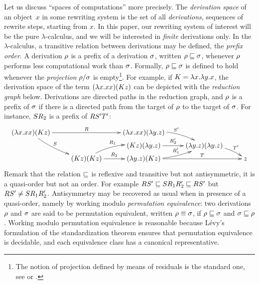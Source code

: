 Let us discuss ``spaces of computations'' more precisely.
The \emph{derivation space} of an object~$x$ in some rewriting system
is the set of all {\em derivations}, \ie sequences of rewrite steps, starting from $x$.
In this paper, our rewriting system of interest will be the pure $\lambda$-calculus,
and we will be interested in \emph{finite} derivations only.
In the $\lambda$-calculus,
a transitive relation between derivations may be defined, the {\em prefix order}.
A derivation $\rho$ is a prefix of a derivation $\sigma$,
written $\rho \sqsubseteq \sigma$,
whenever $\rho$ performs less computational work than $\sigma$.
Formally, $\rho \sqsubseteq \sigma$ is defined to hold whenever the {\em projection} $\rho/\sigma$ 
is empty\footnote{The notion of projection defined by means of residuals
is the standard one, see \eg \cite[Chapter~12]{Barendregt:1984}
or \cite[Section~8.7]{Terese}.}.
For example, if $K = \lambda x. \lambda y. x$,
the derivation space of the term $(\lambda x. xx)(Kz)$
can be depicted with the \emph{reduction graph} below.
Derivations are directed paths in the reduction graph,
and $\rho$ is a prefix of $\sigma$ if there is a directed path from the
target of $\rho$ to the target of $\sigma$.
For instance, $SR_2$ is a prefix of $RS'T'$:
\[
  \xymatrix@R=.1cm{
    (\lam{\var}{\var\var})(K\varthree)
      \ar^-{\redex}[rr]
      \ar@/_.2cm/^-{\redextwo}[rdd]
  &
  &
    (\lam{\var}{\var\var})(\lam{\vartwo}{\varthree})
    \ar@/^.3cm/[rd]^{\redextwo'}
  &
  \\
  &
  &
    (K\varthree)(\lam{\vartwo}{\varthree}) \ar[r]^-{\redex'_2}
  &
    (\lam{\vartwo}{\varthree})(\lam{\vartwo}{\varthree})
    \ar@/^.2cm/[rd]^-{\redexthree'}
  \\
  &
    (K\varthree)(K\varthree) \ar@/^.3cm/[ru]^{\redex_1} \ar[r]^-{\redex_2}
  &
    (\lam{\vartwo}{\varthree})(K\varthree)
      \ar@/_.2cm/[ru]^-{\redex'_1}
      \ar[rr]^-{\redexthree}
  &
  &
    \varthree
  }
\]
Remark that the relation $\sqsubseteq$ is reflexive and transitive but not antisymmetric,
\ie it is a quasi-order but not an order.
For example $RS' \sqsubseteq SR_1R_2' \sqsubseteq RS'$
but $RS' \neq  SR_1R_2'$.
Antisymmetry may be recovered as usual when in presence of a quasi-order,
namely by working modulo {\em permutation equivalence}:
two derivations $\rho$ and $\sigma$
are said to be permutation equivalent,
written $\rho \equiv \sigma$, if $\rho \sqsubseteq \sigma$
and $\sigma \sqsubseteq \rho$.
Working modulo permutation equivalence is reasonable because L\'evy's formulation
of the standardization theorem ensures that permutation equivalence is decidable,
and each equivalence class has a canonical representative.

